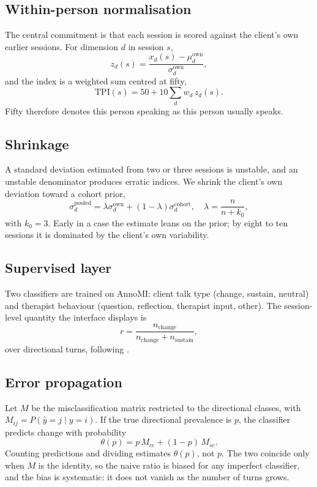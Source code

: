 \documentclass[conference]{IEEEtran}
\begin{document}
\subsection{Within-person normalisation}
The central commitment is that each session is scored against the client's own
earlier sessions. For dimension $d$ in session $s$,
\begin{equation}
z_d(s) = \frac{x_d(s) - \mu_d^{\text{own}}}{\sigma_d^{\text{own}}},
\end{equation}
and the index is a weighted sum centred at fifty,
\begin{equation}
\mathrm{TPI}(s) = 50 + 10 \sum_d w_d \, z_d(s).
\end{equation}
Fifty therefore denotes this person speaking as this person usually speaks.

\subsection{Shrinkage}
A standard deviation estimated from two or three sessions is unstable, and an
unstable denominator produces erratic indices. We shrink the client's own
deviation toward a cohort prior,
\begin{equation}
\sigma^{\text{pooled}}_d = \lambda \sigma^{\text{own}}_d
  + (1-\lambda)\sigma^{\text{cohort}}_d, \quad
\lambda = \frac{n}{n + k_0},
\end{equation}
with $k_0 = 3$. Early in a case the estimate leans on the prior; by eight to
ten sessions it is dominated by the client's own variability.

\subsection{Supervised layer}
Two classifiers are trained on AnnoMI: client talk type (change, sustain,
neutral) and therapist behaviour (question, reflection, therapist input,
other). The session-level quantity the interface displays is
\begin{equation}
r = \frac{n_{\text{change}}}{n_{\text{change}} + n_{\text{sustain}}},
\end{equation}
over directional turns, following \cite{magill2018}.

\subsection{Error propagation}
Let $M$ be the misclassification matrix restricted to the directional classes,
with $M_{ij} = P(\hat{y}=j \mid y=i)$. If the true directional prevalence is
$p$, the classifier predicts change with probability
\begin{equation}
\theta(p) = p\,M_{cc} + (1-p)\,M_{sc}.
\label{eq:theta}
\end{equation}
Counting predictions and dividing estimates $\theta(p)$, not $p$. The two
coincide only when $M$ is the identity, so the naive ratio is biased for any
imperfect classifier, and the bias is systematic: it does not vanish as the
number of turns grows.
\end{document}
